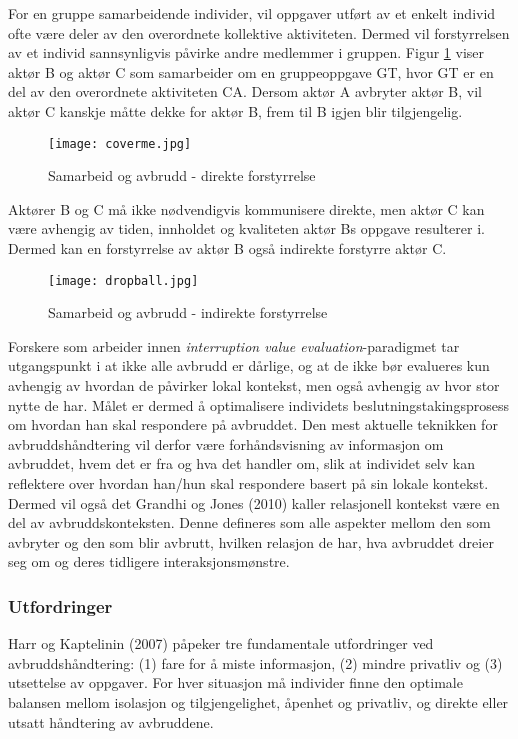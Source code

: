 \noindent
For en gruppe samarbeidende individer, vil oppgaver utført av et enkelt individ ofte være deler av den overordnete kollektive aktiviteten. Dermed vil forstyrrelsen av et individ sannsynligvis påvirke andre medlemmer i gruppen. Figur \ref{direkte} viser aktør B og aktør C som samarbeider om en gruppeoppgave GT, hvor GT er en del av den overordnete aktiviteten CA. Dersom aktør A avbryter aktør B, vil aktør C kanskje måtte dekke for aktør B, frem til B igjen blir tilgjengelig.
\begin{figure}[H]
\centering
\texttt{[image: coverme.jpg]}
\caption{Samarbeid og avbrudd - direkte forstyrrelse}
\label{direkte}
\end{figure}

\noindent
Aktører B og C må ikke nødvendigvis kommunisere direkte, men aktør C kan være avhengig av tiden, innholdet og kvaliteten aktør Bs oppgave resulterer i. Dermed kan en forstyrrelse av aktør B også indirekte forstyrre aktør C.
\begin{figure}[H]
\centering
\texttt{[image: dropball.jpg]}
\caption{Samarbeid og avbrudd - indirekte forstyrrelse}
\label{indirekte}
\end{figure}

\noindent
Forskere som arbeider innen \emph{interruption value evaluation}-paradigmet tar utgangspunkt i at ikke alle avbrudd er dårlige, og at de ikke bør evalueres kun avhengig av hvordan de påvirker lokal kontekst, men også avhengig av hvor stor nytte de har. Målet er dermed å optimalisere individets beslutningstakingsprosess om hvordan han skal respondere på avbruddet. Den mest aktuelle teknikken for avbruddshåndtering vil derfor være forhåndsvisning av informasjon om avbruddet, hvem det er fra og hva det handler om, slik at individet selv kan reflektere over hvordan han/hun skal respondere basert på sin lokale kontekst. Dermed vil også det Grandhi og Jones (2010) kaller relasjonell kontekst være en del av avbruddskonteksten. Denne defineres som alle aspekter mellom den som avbryter og den som blir avbrutt, hvilken relasjon de har, hva avbruddet dreier seg om og deres tidligere interaksjonsmønstre.

\subsubsection{Utfordringer}
Harr og Kaptelinin (2007) påpeker tre fundamentale utfordringer ved avbruddshåndtering: (1) fare for å miste informasjon, (2) mindre privatliv og (3) utsettelse av oppgaver. For hver situasjon må individer finne den optimale balansen mellom isolasjon og tilgjengelighet, åpenhet og privatliv, og direkte eller utsatt håndtering av avbruddene.